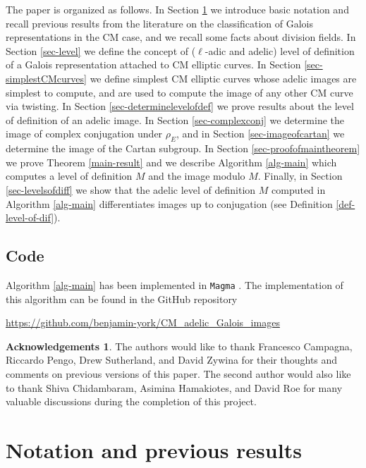 \documentclass[11pt]{amsart}
\theoremstyle{definition}
\newtheorem*{ack}{Acknowledgements}
\begin{document}
The paper is organized as follows. In Section \ref{sec-notation} we introduce basic notation and recall previous results from the literature on the classification of Galois representations in the CM case, and we recall some facts about division fields. In Section \ref{sec-level} we define the concept of ($\ell$-adic and adelic) level of definition of a Galois representation attached to CM elliptic curves. In Section \ref{sec-simplestCMcurves} we define  simplest CM elliptic curves whose adelic images are simplest to compute, and are used to compute the image of any other CM curve via twisting. In Section \ref{sec-determinelevelofdef} we prove results about the level of definition of an adelic image. In Section  \ref{sec-complexconj} we determine the image of complex conjugation under $\rho_E$, and in Section  \ref{sec-imageofcartan} we determine the image of the Cartan subgroup. In Section \ref{sec-proofofmaintheorem} we prove Theorem \ref{main-result} and we describe Algorithm \ref{alg-main} which computes a level of definition $M$ and the image modulo $M$. Finally, in Section \ref{sec-levelsofdiff} we show that the adelic level of definition $M$ computed in Algorithm \ref{alg-main} differentiates images up to conjugation (see Definition \ref{def-level-of-dif}).

\subsection{Code}

Algorithm \ref{alg-main} has been implemented in \verb|Magma| \cite{magma}. The implementation of this algorithm can be found in the GitHub repository \cite{githubrepo}
\begin{center}
    \url{https://github.com/benjamin-york/CM_adelic_Galois_images}
\end{center}


\begin{ack}
    The authors would like to thank Francesco Campagna, Riccardo Pengo, Drew Sutherland, and David Zywina for their thoughts and comments on previous versions of this paper. The second author would also like to thank Shiva Chidambaram, Asimina Hamakiotes, and David Roe for many valuable discussions during the completion of this project.
\end{ack}


\section{Notation and previous results}\label{sec-notation}
\end{document}
